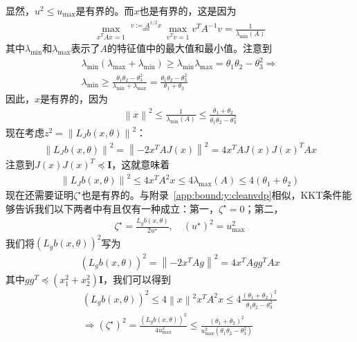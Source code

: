 显然，$u^2 \le u_{\max}$是有界的。而$x$也是有界的，这是因为
\begin{eqnarray}
  \max_{x^T A x = 1} \overset{v := A^{1/2}x}{=} 
  \max_{v^T v = 1} v^T A^{-1} v = \frac{1}{\lambda_{\min}(A)}
\end{eqnarray}
其中$\lambda_{\min}$和$\lambda_{\max}$表示了$A$的特征值中的最大值和最小值。注意到
\begin{eqnarray}
  \lambda_{\min} (\lambda_{\max} + \lambda_{\min}) \ge \lambda_{\min} \lambda_{\max} = \theta_1 \theta_2 - \theta_3^2 \Rightarrow \\
  \lambda_{\min} \ge \frac{
    \theta_1 \theta_2 - \theta_3^2
  }{
    \lambda_{\min} + \lambda_{\max}
  } = \frac{
    \theta_1 \theta_2 - \theta_3^2
  }{
    \theta_1 + \theta_2
  }
\end{eqnarray}
因此，$x$是有界的，因为
\begin{eqnarray}
  \left\lVert x \right\rVert^2 \le \frac{1}{\lambda_{\min}(A)} 
  \le \frac{
    \theta_1 + \theta_2
  }{
    \theta_1 \theta_2 - \theta_3^2
  }
\end{eqnarray}
现在考虑$z^2 = \left\lVert L_Jb(x, \theta) \right\rVert^2$：
\begin{eqnarray}
  \left\lVert L_Jb(x, \theta) \right\rVert^2 = 
  \left\lVert -2 x^T A J(x) \right\rVert^2 = 
  4 x^T A J(x)J(x)^T A x
\end{eqnarray}
注意到$J(x)J(x)^T \preceq \textbf{I}$，这就意味着
\begin{eqnarray}
  \left\lVert L_Jb(x, \theta) \right\rVert^2 \le 
  4x^T A^2 x \le 4 \lambda_{\max}(A) \le 4(\theta_1 + \theta_2)
\end{eqnarray}
现在还需要证明$\zeta^\star$也是有界的。与附录~\ref{app:bound:y:cleanvdp}相似，KKT条件能够告诉我们以下两者中有且仅有一种成立：第一，$\zeta^\star = 0$；第二，
\begin{eqnarray}
  \zeta^\star = \frac{L_gb(x, \theta)}{2u^\star}, \quad (u^\star)^2 = u_{\max}^2
\end{eqnarray}
我们将$(L_gb(x, \theta))^2$写为
\begin{eqnarray}
  (L_gb(x, \theta))^2 = 
  \left\lVert -2 x^T Ag \right\rVert^2 = 4 x^T Agg^T Ax
\end{eqnarray}
其中$gg^T \preceq (x_1^2 + x_2^2) \textbf{I}$，我们可以得到
\begin{eqnarray}
  (L_gb(x, \theta))^2 \le 
  4 \left\lVert x \right\rVert^2 x^T A^2 x \le 
  4 \frac{
    (\theta_1 + \theta_2)^2
  }{
    \theta_1 \theta_2 - \theta_3^2
  } \\
  \Rightarrow (\zeta^\star)^2 = 
  \frac{
    (L_gb(x, \theta))^2
  }{4 u_{\max}^2} \le 
  \frac{
    (\theta_1 + \theta_2)^2
  }{
    u_{\max}^2 (\theta_1 \theta_2 - \theta_3^2)
  }
\end{eqnarray}


